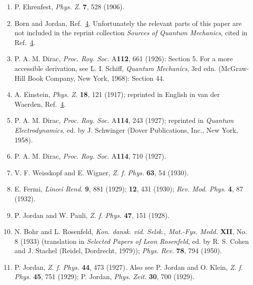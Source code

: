 \begin{enumerate}
\item[32a.]\label{ref:1.32a} P. Ehrenfest, \emph{Phys. Z.} \textbf{7}, 528 (1906).

\item\label{ref:1.33} Born and Jordan, Ref.~\hyperref[ref:1.4]{4}. Unfortunately the relevant parts of this paper
are not included in the reprint collection \emph{Sources of Quantum Mechanics},
cited in Ref.~\hyperref[ref:1.4]{4}.

\item\label{ref:1.34} P. A. M. Dirac, \emph{Proc. Roy. Soc.} A\textbf{112}, 661 (1926):
Section 5. For a more accessible derivation, see L. I. Schiff, \emph{Quantum
Mechanics}, 3rd edn. (McGraw-Hill Book Company, New York, 1968): Section 44.

\item[34a.]\label{ref:1.34a} A. Einstein, \emph{Phys. Z.} \textbf{18}, 121 (1917); reprinted
in English in van der Waerden, Ref.~\hyperref[ref:1.4]{4}.

\item\label{ref:1.35} P. A. M. Dirac, \emph{Proc. Roy. Soc.} A\textbf{114}, 243 (1927);
reprinted in \emph{Quantum Electrodynamics}, ed. by J. Schwinger (Dover
Publications, Inc., New York, 1958).

\item\label{ref:1.36} P. A. M. Dirac, \emph{Proc. Roy. Soc.} A\textbf{114}, 710 (1927).

\item[36a.]\label{ref:1.36a} V. F. Weisskopf and E. Wigner, \emph{Z. f. Phys.} \textbf{63}, 54
(1930).

\item[36b.]\label{ref:1.36b} E. Fermi, \emph{Lincei Rend.} \textbf{9}, 881 (1929); \textbf{12},
431 (1930); \emph{Rev. Mod. Phys.} \textbf{4}, 87 (1932).

\item\label{ref:1.37} P. Jordan and W. Pauli, \emph{Z. f. Phys.} \textbf{47}, 151 (1928).

\item\label{ref:1.38} N. Bohr and L. Rosenfeld, \emph{Kon. dansk. vid. Selsk., Mat.-Fys.
Medd.} \textbf{XII}, No. 8 (1933) (translation in \emph{Selected Papers of Leon
Rosenfeld}, ed. by R. S. Cohen and J. Stachel (Reidel, Dordrecht, 1979));
\emph{Phys. Rev.} \textbf{78}, 794 (1950).

\item\label{ref:1.39} P. Jordan, \emph{Z. f. Phys.} \textbf{44}, 473 (1927). Also see P.
Jordan and O. Klein, \emph{Z. f. Phys.} \textbf{45}, 751 (1929); P. Jordan,
\emph{Phys. Zeit.} \textbf{30}, 700 (1929).


\end{enumerate}
